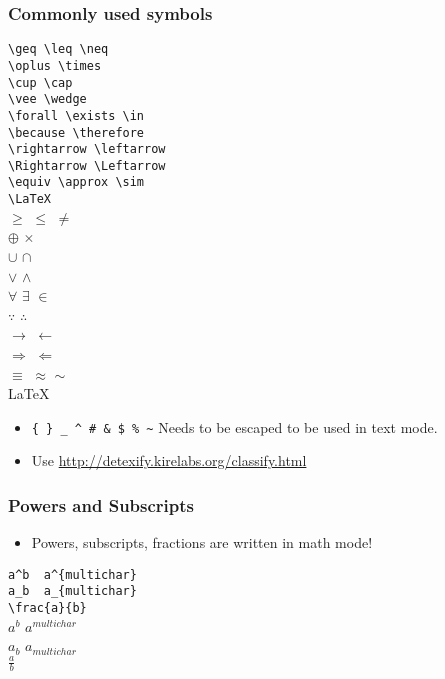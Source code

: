 \documentclass{beamer}
\begin{document}
\begin{frame}[fragile]
\frametitle{Commonly used symbols}
  \begin{multicols}{2}
    \verb+\geq \leq \neq+ \\
    \verb+\oplus \times+ \\
    \verb+\cup \cap+ \\
    \verb+\vee \wedge+ \\
    \verb+\forall \exists \in+  \\
    \verb+\because \therefore+  \\
    \verb+\rightarrow \leftarrow+\\
    \verb+\Rightarrow \Leftarrow+ \\
    \verb+\equiv \approx \sim+ \\
    \verb+\LaTeX+ \\
  \columnbreak
    $\geq$ $\leq$ $\neq$\\
    $\oplus$ $\times$\\
    $\cup$ $\cap$\\
    $\vee$ $\wedge$\\
    $\forall$ $\exists$ $\in$\\
    $\because$ $\therefore$\\
    $\rightarrow$ $\leftarrow$\\
    $\Rightarrow$ $\Leftarrow$\\
    $\equiv$ $\approx$ $\sim $\\
    \LaTeX
  \end{multicols}
  \begin{itemize}
    \item \verb.{ } _ ^ # & $ % ~. Needs to be escaped to be used in text mode.
    \item Use \url{http://detexify.kirelabs.org/classify.html}
  \end{itemize}
\end{frame}

\begin{frame}[fragile]
  \frametitle{Powers and Subscripts}
  \begin{itemize}
    \item Powers, subscripts, fractions are written in math mode!
  \end{itemize}
  \begin{multicols}{2}
    \verb+a^b  a^{multichar}+\\
    \verb+a_b  a_{multichar}+\\
    \verb+\frac{a}{b}+\\
  \columnbreak
    $a^b$ $a^{multichar}$\\
    $a_b$ $a_{multichar}$\\
    $\frac{a}{b}$
  \end{multicols}
\end{frame}
\end{document}
